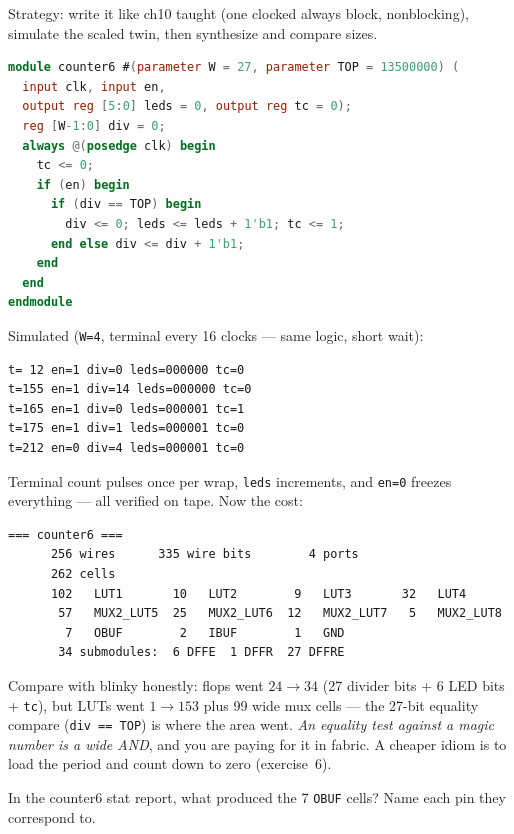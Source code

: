 \begin{example}
Strategy: write it like ch10 taught (one clocked always block, nonblocking),
simulate the scaled twin, then synthesize and compare sizes.

\begin{lstlisting}[language=Verilog]
module counter6 #(parameter W = 27, parameter TOP = 13500000) (
  input clk, input en,
  output reg [5:0] leds = 0, output reg tc = 0);
  reg [W-1:0] div = 0;
  always @(posedge clk) begin
    tc <= 0;
    if (en) begin
      if (div == TOP) begin
        div <= 0; leds <= leds + 1'b1; tc <= 1;
      end else div <= div + 1'b1;
    end
  end
endmodule
\end{lstlisting}

Simulated (\texttt{W=4}, terminal every 16 clocks --- same logic, short wait):

\begin{lstlisting}
t= 12 en=1 div=0 leds=000000 tc=0
t=155 en=1 div=14 leds=000000 tc=0
t=165 en=1 div=0 leds=000001 tc=1
t=175 en=1 div=1 leds=000001 tc=0
t=212 en=0 div=4 leds=000001 tc=0
\end{lstlisting}

Terminal count pulses once per wrap, \texttt{leds} increments, and
\texttt{en=0} freezes everything --- all verified on tape. Now the cost:

\begin{lstlisting}
=== counter6 ===
      256 wires      335 wire bits        4 ports
      262 cells
      102   LUT1       10   LUT2        9   LUT3       32   LUT4
       57   MUX2_LUT5  25   MUX2_LUT6  12   MUX2_LUT7   5   MUX2_LUT8
        7   OBUF        2   IBUF        1   GND
       34 submodules:  6 DFFE  1 DFFR  27 DFFRE
\end{lstlisting}

Compare with blinky honestly: flops went $24\to34$ (27 divider bits + 6 LED
bits + \texttt{tc}), but LUTs went $1\to153$ plus 99 wide mux cells --- the
27-bit equality compare (\texttt{div == TOP}) is where the area went. \emph{An
equality test against a magic number is a wide AND}, and you are paying for it
in fabric. A cheaper idiom is to load the period and count down to zero
(exercise~6).
\end{example}

\begin{exercise}[easy]
In the counter6 stat report, what produced the 7 \texttt{OBUF} cells? Name
each pin they correspond to.
\end{exercise}

